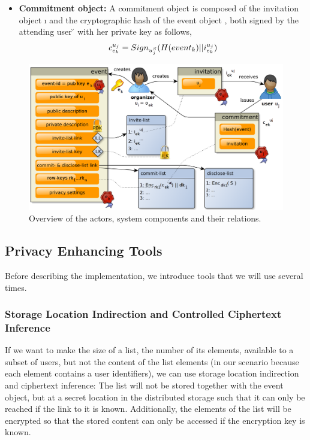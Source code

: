 \begin{itemize}
\item \textbf{Commitment object:} 
A commitment object is composed of the invitation object \i{} and the cryptographic 
hash of the event object \eo{}, both signed by the attending 
user \u{} with her private key \uS{} as follows,
\begin{equation*}
		\c{} = Sign_{\uS{}}(H(\eo{})||\i{})
\end{equation*}
\end{itemize}

\begin{figure}
  \centering
  \includegraphics[width=.8\linewidth]{images/event-invitations-dosns/system-implementation}
  \caption{Overview of the actors, system components and their relations.}
  \label{figure:event-invitations-dosns:overview-objects-actions}
\end{figure}


\subsection{Privacy Enhancing Tools}
	\label{subsection:event-invitations-dosns:privacy-enhancing-tools}
Before describing the implementation, we introduce tools that we will use several times.

\subsubsection{Storage Location Indirection and Controlled Ciphertext Inference}
	\label{subsubsection:event-invitations-dosns:indirection-and-ciphertext-inferences}
If we want to make the size of a list, \ie the number of its elements, available 
to a subset of users, but not the content of 
the list elements (in our scenario because each element contains 
a user identifiers), we can use storage location indirection and ciphertext inference:
%
The list will not be stored together with the event object, but at a secret location in the distributed storage such that it can only 
be reached if the link to it is known. Additionally, the elements of the list will be encrypted so 
that the stored content can only be accessed if the encryption key is known. 

